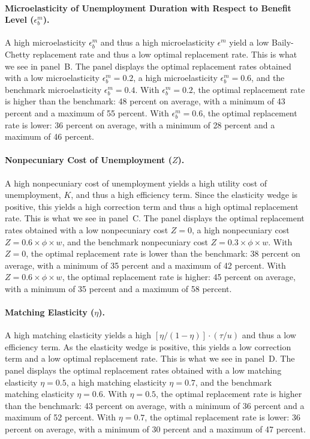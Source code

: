 \documentclass[letterpaper,12pt,leqno]{article}
\newcommand{\brk}[1]{\left[ #1 \right]}
\def \e{{\epsilon}}
\def \f{{\phi}}
\begin{document}
\paragraph{Microelasticity of Unemployment Duration with Respect to Benefit Level ($\e^{m}_{b}$).} A high microelasticity $\e^{m}_{b}$ and thus a high microelasticity $\e^{m}$ yield a low Baily-Chetty replacement rate and thus a low optimal replacement rate. This is what we see in panel~B. The panel displays the optimal replacement rates obtained with a low microelasticity $\e^{m}_{b}=0.2$, a high microelasticity $\e^{m}_{b}=0.6$, and the benchmark microelasticity $\e^{m}_{b}=0.4$. With $\e^{m}_{b}=0.2$, the optimal replacement rate is higher than the benchmark: 48 percent on average, with a minimum of 43 percent and a maximum of 55 percent. With $\e^{m}_{b}=0.6$, the optimal replacement rate is lower:  36 percent on average, with a minimum of 28 percent and a maximum of 46 percent.

\paragraph{Nonpecuniary Cost of Unemployment ($Z$).} A high nonpecuniary cost of unemployment yields a high utility cost of unemployment, $K$, and thus a high efficiency term. Since the elasticity wedge is positive, this yields a high correction term and thus a high optimal replacement rate. This is what we see in panel~C. The panel displays the optimal replacement rates obtained with a low nonpecuniary cost $Z=0$, a high nonpecuniary cost $Z=0.6\times \f\times w $, and the benchmark nonpecuniary cost $Z=0.3\times \f\times w $. With $Z=0$, the optimal replacement rate is lower than the benchmark: 38 percent on average, with a minimum of 35 percent and a maximum of 42 percent. With $Z=0.6\times \f\times w $, the optimal replacement rate is higher: 45 percent on average, with a minimum of 35 percent and a maximum of 58 percent.

\paragraph{Matching Elasticity ($\eta$).} A high matching elasticity yields a high $\brk{\eta/(1-\eta)}\cdot (\tau/u)$ and thus a low efficiency term. As the elasticity wedge is positive, this yields a low correction term and a low optimal replacement rate. This is what we see in panel~D. The panel displays the optimal replacement rates obtained with a low matching elasticity $\eta=0.5$, a high matching elasticity $\eta=0.7$, and the benchmark matching elasticity $\eta=0.6$. With $\eta=0.5$, the optimal replacement rate is higher than the benchmark: 43 percent on average, with a minimum of 36 percent and a maximum of 52 percent. With $\eta=0.7$, the optimal replacement rate is lower: 36 percent on average, with a minimum of 30 percent and a maximum of 47 percent.
\end{document}
